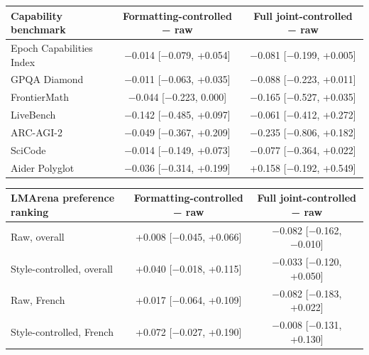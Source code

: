 \documentclass[
]{article}
\newcounter{none} %
\begin{document}
{\def\LTcaptype{none}
\footnotesize
\setlength{\tabcolsep}{4pt}
\begin{longtable}[]{@{}lcc@{}}
\toprule\noalign{}
Capability benchmark & Formatting-controlled − raw &
Full joint-controlled − raw \\
\midrule\noalign{}
\endhead
\bottomrule\noalign{}
\endlastfoot
Epoch Capabilities Index & −0.014 {[}−0.079, +0.054{]} &
−0.081 {[}−0.199, +0.005{]} \\
GPQA Diamond & −0.011 {[}−0.063, +0.035{]} &
−0.088 {[}−0.223, +0.011{]} \\
FrontierMath & −0.044 {[}−0.223, 0.000{]} &
−0.165 {[}−0.527, +0.035{]} \\
LiveBench & −0.142 {[}−0.485, +0.097{]} &
−0.061 {[}−0.412, +0.272{]} \\
ARC-AGI-2 & −0.049 {[}−0.367, +0.209{]} &
−0.235 {[}−0.806, +0.182{]} \\
SciCode & −0.014 {[}−0.149, +0.073{]} &
−0.077 {[}−0.364, +0.022{]} \\
Aider Polyglot & −0.036 {[}−0.314, +0.199{]} &
+0.158 {[}−0.192, +0.549{]} \\
\end{longtable}
}

{\def\LTcaptype{none}
\footnotesize
\setlength{\tabcolsep}{4pt}
\begin{longtable}[]{@{}lcc@{}}
\toprule\noalign{}
LMArena preference ranking & Formatting-controlled − raw &
Full joint-controlled − raw \\
\midrule\noalign{}
\endhead
\bottomrule\noalign{}
\endlastfoot
Raw, overall & +0.008 {[}−0.045, +0.066{]} &
−0.082 {[}−0.162, −0.010{]} \\
Style-controlled, overall & +0.040 {[}−0.018, +0.115{]} &
−0.033 {[}−0.120, +0.050{]} \\
Raw, French & +0.017 {[}−0.064, +0.109{]} &
−0.082 {[}−0.183, +0.022{]} \\
Style-controlled, French & +0.072 {[}−0.027, +0.190{]} &
−0.008 {[}−0.131, +0.130{]} \\
\end{longtable}
}
\end{document}
